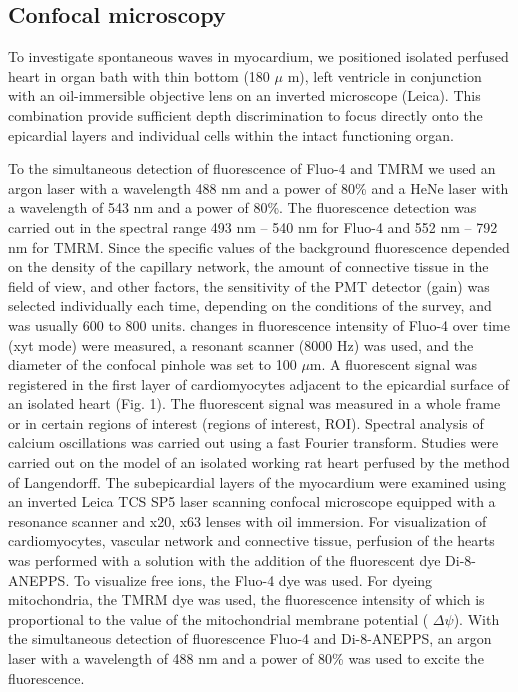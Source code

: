\documentclass{biophys-new}
\begin{document}
\subsection*{Confocal microscopy}
To investigate spontaneous  waves in myocardium, we positioned isolated perfused heart in organ bath with thin bottom (180 $\mu$ m), left ventricle in conjunction with an oil-immersible objective lens on an inverted microscope (Leica).
This combination provide sufficient depth discrimination to focus directly onto the epicardial layers and individual cells within the intact functioning organ.

To the simultaneous detection of fluorescence of Fluo-4 and TMRM we used an argon laser with a wavelength 488 nm and a power of 80\% and a HeNe laser with a wavelength of 543 nm and a power of 80\%. The fluorescence detection was carried out in the spectral range 493 nm -- 540 nm for Fluo-4 and 552 nm -- 792 nm for TMRM. Since the specific values of the background fluorescence depended on the density of the capillary network, the amount of connective tissue in the field of view, and other factors, the sensitivity of the PMT detector (gain) was selected individually each time, depending on the conditions of the survey, and was usually 600 to 800 units.
changes in fluorescence intensity of Fluo-4 over time (xyt mode) were measured, a resonant scanner (8000 Hz) was used, and the diameter of the confocal pinhole was set to 100 $\mu$m.
A fluorescent signal was registered in the first layer of cardiomyocytes adjacent to the epicardial surface of an isolated heart (Fig. 1). The fluorescent signal was measured in a whole frame or in certain regions of interest (regions of interest, ROI).
Spectral analysis of calcium oscillations was carried out using a fast Fourier transform.
Studies were carried out on the model of an isolated working rat heart perfused by the method of Langendorff.
The subepicardial layers of the myocardium were examined using an inverted Leica TCS SP5 laser scanning confocal microscope equipped with a resonance scanner and x20, x63 lenses with oil immersion.
For visualization of cardiomyocytes, vascular network and connective tissue, perfusion of the hearts was performed with a solution with the addition of the fluorescent dye Di-8-ANEPPS.
To visualize free  ions, the Fluo-4 dye was used.
For dyeing mitochondria, the TMRM dye was used, the fluorescence intensity of which is proportional to the value of the mitochondrial membrane potential ( $\Delta\psi$).
With the simultaneous detection of fluorescence Fluo-4 and Di-8-ANEPPS, an argon laser with a wavelength of 488 nm and a power of 80\% was used to excite the fluorescence.
\end{document}
